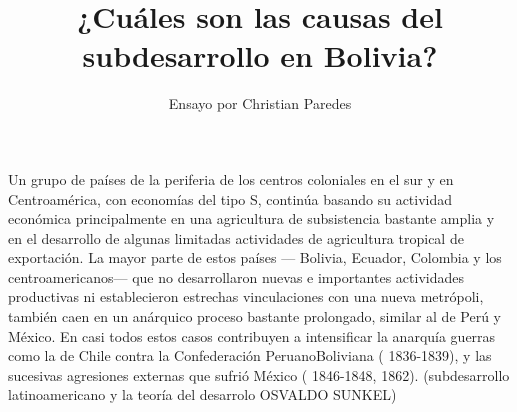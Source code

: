 \documentclass[10pt]{book}
\begin{document}
\normalfont

\author{Ensayo por Christian Paredes}
\title{¿Cuáles son las causas del subdesarrollo en Bolivia?}
\date{}
\pagestyle{empty}
\maketitle
\thispagestyle{empty}
\let\cleardoublepage\clearpage
\tableofcontents								%


 
\let\cleardoublepage\clearpage

Un grupo de países de la periferia de los centros coloniales en el sur y en Centroamérica, con economías del tipo S, continúa basando su actividad económica principalmente en una agricultura de subsistencia bastante amplia y en el desarrollo de algunas limitadas actividades de agricultura tropical de exportación. La mayor parte de estos países — Bolivia, Ecuador, Colombia y los centroamericanos— que no desarrollaron nuevas e importantes actividades productivas ni establecieron estrechas vinculaciones con una nueva metrópoli, también caen en un anárquico proceso bastante prolongado, similar al de Perú y México. En casi todos estos casos contribuyen a intensificar la anarquía guerras como la de Chile contra la Confederación PeruanoBoliviana ( 1836-1839), y las sucesivas agresiones externas que sufrió México
( 1846-1848, 1862). (subdesarrollo latinoamericano y la teoría del desarrolo OSVALDO SUNKEL)
\end{document}
